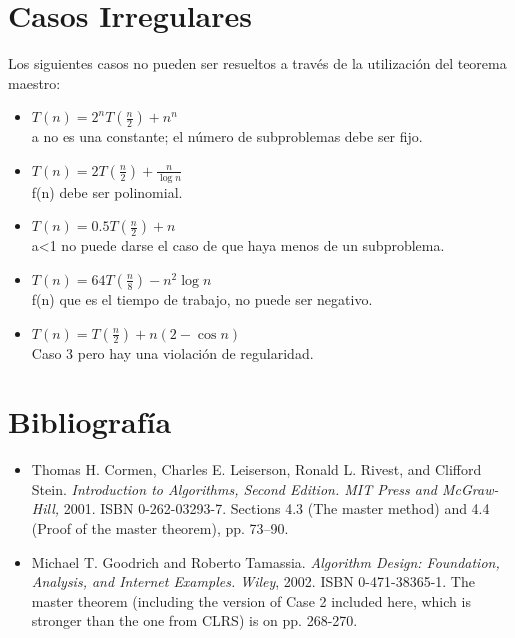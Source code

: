 \documentclass{article}
\begin{document}
    \section{Casos Irregulares}
    Los siguientes casos no pueden ser resueltos a través de la utilización del teorema maestro:\cite{massacusets}
    \begin{itemize}
        \item $T(n)=2^{n}T\left({\frac {n}{2}}\right)+n^{n}$\\
        a no es una constante; el número de subproblemas debe ser fijo.
        \item $ T(n)=2T\left({\frac {n}{2}}\right)+{\frac {n}{\log n}}$\\
        f(n) debe ser polinomial.
        \item $T(n)=0.5T\left({\frac {n}{2}}\right)+n$ \\
        a<1 no puede darse el caso de que haya menos de un subproblema.
        \item $T(n)=64T\left({\frac {n}{8}}\right)-n^{2}\log n$\\
        f(n) que es el tiempo de trabajo, no puede ser negativo.
        \item $ T(n)=T\left({\frac {n}{2}}\right)+n(2-\cos n)$\\
        Caso 3 pero hay una violación de regularidad.
    \end{itemize}
  
    \section{Bibliografía}
\begin{itemize}
    \item Thomas H. Cormen, Charles E. Leiserson, Ronald L. Rivest, and Clifford Stein. \textit{Introduction to Algorithms, Second Edition. MIT Press and McGraw-Hill,} 2001. ISBN 0-262-03293-7. Sections 4.3 (The master method) and 4.4 (Proof of the master theorem), pp. 73–90.
    \item Michael T. Goodrich and Roberto Tamassia. \textit{ Algorithm Design: Foundation, Analysis, and Internet Examples. Wiley}, 2002. ISBN 0-471-38365-1. The master theorem (including the version of Case 2 included here, which is stronger than the one from CLRS) is on pp. 268-270.
  \end{itemize}
  
    
    
    
\end{document}
